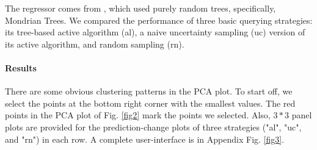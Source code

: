 \documentclass{article}
\begin{document}
The regressor comes from \citet{NEURIPS2018_dc4c44f6}, which used purely random trees, specifically, Mondrian Trees. We compared the performance of three basic querying strategies: its tree-based active algorithm (al), a naive uncertainty sampling (uc) version of its active algorithm, and random sampling (rn).


\paragraph{Results}

There are some obvious clustering patterns in the PCA plot. To start off, we select the points at the bottom right corner with the smallest values. The red points in the PCA plot of Fig. \ref{fig2} mark the points we selected. Also, $3*3$ panel plots are provided for the prediction-change plots of three strategies ("al", "uc", and "rn") in each row. A complete user-interface is in Appendix Fig. \ref{fig3}. 
\end{document}
